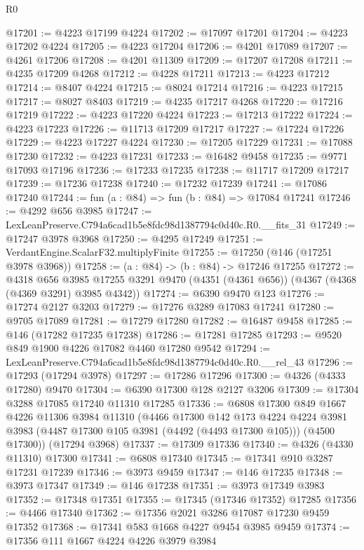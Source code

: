 \begin{lexlean}{R0}
\begin{coremodule}
@17201 := @4223 @17199 @4224
@17202 := @17097 @17201
@17204 := @4223 @17202 @4224
@17205 := @4223 @17204
@17206 := @4201 @17089
@17207 := @4261 @17206
@17208 := @4201 @11309
@17209 := @17207 @17208
@17211 := @4235 @17209 @4268
@17212 := @4228 @17211
@17213 := @4223 @17212
@17214 := @8407 @4224
@17215 := @8024 @17214
@17216 := @4223 @17215
@17217 := @8027 @8403
@17219 := @4235 @17217 @4268
@17220 := @17216 @17219
@17222 := @4223 @17220 @4224
@17223 := @17213 @17222
@17224 := @4223 @17223
@17226 := @11713 @17209 @17217
@17227 := @17224 @17226
@17229 := @4223 @17227 @4224
@17230 := @17205 @17229
@17231 := @17088 @17230
@17232 := @4223 @17231
@17233 := @16482 @9458
@17235 := @9771 @17093 @17196
@17236 := @17233 @17235
@17238 := @11717 @17209 @17217
@17239 := @17236 @17238
@17240 := @17232 @17239
@17241 := @17086 @17240
@17244 := fun (a : @84) => fun (b : @84) => @17084 @17241
@17246 := @4292 @656 @3985
@17247 := LexLeanPreserve.C794a6cad1b5e8fdc98d1387794c0d40c.R0.__fits_31
@17249 := @17247 @3978 @3968
@17250 := @4295 @17249
@17251 := VerdantEngine.ScalarF32.multiplyFinite
@17255 := @17250 (@146 (@17251 @3978 @3968))
@17258 := (a : @84) -> (b : @84) -> @17246 @17255
@17272 := @4318
    @656
    @3985
    @17255
    @3291
    @9470
    (@4351 (@4361 @656))
    (@4367 (@4368 (@4369 @3291) @3985 @4342))
@17274 := @6390 @9470 @123
@17276 := @17274 @2127 @3203
@17279 := @17276 @3289 @17083 @17241
@17280 := @9705 @17089
@17281 := @17279 @17280
@17282 := @16487 @9458
@17285 := @146 (@17282 @17235 @17238)
@17286 := @17281 @17285
@17293 := @9520 @849 @1900 @4226 @17082 @4460 @17280 @9542
@17294 := LexLeanPreserve.C794a6cad1b5e8fdc98d1387794c0d40c.R0.__rel_43
@17296 := @17293 (@17294 @3978)
@17297 := @17286 @17296
@17300 := @4326 (@4333 @17280) @9470
@17304 := @6390 @17300 @128 @2127 @3206
@17309 := @17304 @3288 @17085 @17240 @11310 @17285
@17336 := @6808
    @17300
    @849
    @1667
    @4226
    @11306
    @3984
    @11310
    (@4466
      @17300
      @142
      @173
      @4224
      @4224
      @3981
      @3983
      (@4487 @17300 @105 @3981 (@4492 (@4493 @17300 @105)))
      (@4500 @17300))
    (@17294 @3968)
@17337 := @17309 @17336
@17340 := @4326 (@4330 @11310) @17300
@17341 := @6808 @17340
@17345 := @17341 @910 @3287 @17231 @17239
@17346 := @3973 @9459
@17347 := @146 @17235
@17348 := @3973 @17347
@17349 := @146 @17238
@17351 := @3973 @17349 @3983
@17352 := @17348 @17351
@17355 := @17345 (@17346 @17352) @17285
@17356 := @4466 @17340
@17362 := @17356 @2021 @3286 @17087 @17230 @9459 @17352
@17368 := @17341 @583 @1668 @4227 @9454 @3985 @9459
@17374 := @17356 @111 @1667 @4224 @4226 @3979 @3984

\end{coremodule}
\end{lexlean}
